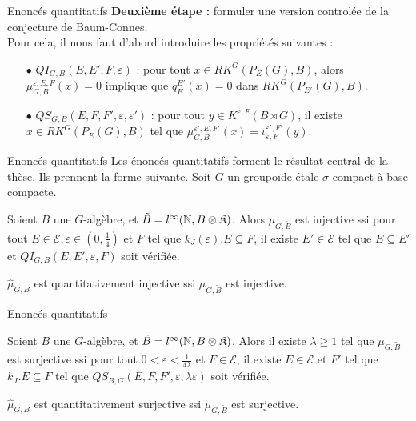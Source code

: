 \begin{frame}{Enoncés quantitatifs}
\textbf{Deuxième étape :} formuler une version controlée de la conjecture de Baum-Connes.\\
\vspace{0.3 cm}
Pour cela, il nous faut d'abord introduire les propriétés suivantes :\\
\vspace{0.3 cm}
\begin{itemize}
\item[$\bullet$] $QI_{G,B}(E,E',F,\varepsilon)$ : pour tout $x\in RK^G(P_E(G), B )$, alors $\mu^{\varepsilon,E,F}_{G,B}(x) = 0$ implique que $q_E^{E'}(x)=0$ dans $RK^G(P_{E'}(G),B)$.
\vspace{0.3 cm}
\item[$\bullet$] $QS_{G,B}(E,F,F',\varepsilon,\varepsilon')$ : pour tout $y\in K^{\varepsilon,F}(B\rtimes G)$, il existe $x\in RK^G(P_E(G),B)$ tel que $\mu^{\varepsilon',E,F'}_{G,B}(x)=\iota_{\varepsilon,F}^{\varepsilon',F'}(y)$.\\
\end{itemize} 
\end{frame}

\begin{frame}{Enoncés quantitatifs}
Les énoncés quantitatifs forment le résultat central de la thèse. Ils prennent la forme suivante. Soit $G$ un groupoïde étale $\sigma$-compact à base compacte.\\
\vspace{0.3 cm}
\begin{thmfr}
Soient $B$ une $G$-algèbre, et $\tilde B = l^\infty(\mathbb N,B\otimes\mathfrak K)$. Alors 
$\mu_{G,\tilde B}$ est injective ssi 
pour tout $E\in\mathcal E,\varepsilon\in(0,\frac{1}{4})$ et $F$ tel que $k_J(\varepsilon).E\subseteq F$, il existe $E' \in\mathcal E$ tel que $E\subseteq E'$ et $QI_{G,B}(E,E',\varepsilon,F)$ soit vérifiée.
\end{thmfr}
\vspace{0.3 cm}
$\hat\mu_{G,B}$ est quantitativement injective ssi $\mu_{G,\tilde B}$ est injective.
\end{frame}

\begin{frame}{Enoncés quantitatifs}
\begin{thmfr}
Soient $B$ une $G$-algèbre, et $\tilde B = l^\infty(\mathbb N,B\otimes\mathfrak K)$. Alors il existe $\lambda \geq 1$ tel que $\mu_{G,\tilde B}$ est surjective ssi pour tout $0<\varepsilon<\frac{1}{4\lambda}$ et $F\in\mathcal E$, il existe $E\in\mathcal E$ et $F'$ tel que $k_J .E \subseteq F$ tel que $QS_{B,G}(E,F,F',\varepsilon,\lambda\varepsilon)$ soit vérifiée.
\end{thmfr}
\vspace{0.3 cm}
$\hat\mu_{G,B}$ est quantitativement surjective ssi $\mu_{G,\tilde B}$ est surjective.
\end{frame}

